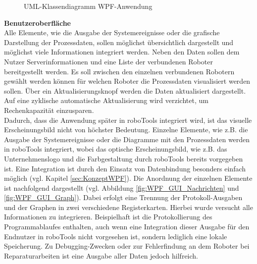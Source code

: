 \documentclass[ a4paper,
                oneside,
                toc=bibliography,
                toc=listof
                ]{scrbook}
\begin{document}
\begin{figure}[!h]
		\caption{UML-Klassendiagramm WPF-Anwendung}
		\label{fig:UMLKlassenWPF}
	\end{figure}
	\clearpage
	\noindent
	\textbf{Benutzeroberfläche}\\
	Alle Elemente, wie die Ausgabe der Systemereignisse oder die grafische Darstellung der Prozessdaten, sollen möglichst übersichtlich dargestellt und möglichst viele Informationen integriert werden. Neben den Daten sollen dem Nutzer Serverinformationen und eine Liste der verbundenen Roboter bereitgestellt werden. Es soll zwischen den einzelnen verbundenen Robotern gewählt werden können für welchen Roboter die Prozessdaten visualisiert werden sollen. Über ein Aktualisierungsknopf werden die Daten aktualisiert dargestellt. Auf eine zyklische automatische Aktualisierung wird verzichtet, um Rechenkapazität einzusparen.\\
	Dadurch, dass die Anwendung später in roboTools integriert wird, ist das visuelle Erscheinungsbild nicht von höchster Bedeutung. Einzelne Elemente, wie z.B. die Ausgabe der Systemereignisse oder die Diagramme mit den Prozessdaten werden in roboTools integriert, wobei das optische Erscheinungsbild, wie z.B. das Unternehmenslogo und die Farbgestaltung durch roboTools bereits vorgegeben ist. Eine Integration ist durch den Einsatz von Datenbindung besonders einfach möglich (vgl. Kapitel \ref{sec:KonzeptWPF}).
	Die Anordnung der einzelnen Elemente ist nachfolgend dargestellt (vgl. Abbildung \ref{fig:WPF_GUI_Nachrichten} und \ref{fig:WPF_GUI_Graph}). Dabei erfolgt eine Trennung der Protokoll-Ausgaben und der Graphen in zwei verschiedene Registerkarten. Hierbei wurde versucht alle Informationen zu integrieren. Beispielhaft ist die Protokollierung des Programmablaufes enthalten, auch wenn eine Integration dieser Ausgabe für den Endnutzer in roboTools nicht vorgesehen ist, sondern lediglich eine lokale Speicherung. Zu Debugging-Zwecken oder zur Fehlerfindung an dem Roboter bei Reparaturarbeiten ist eine Ausgabe aller Daten jedoch hilfreich. \\
\end{document}
